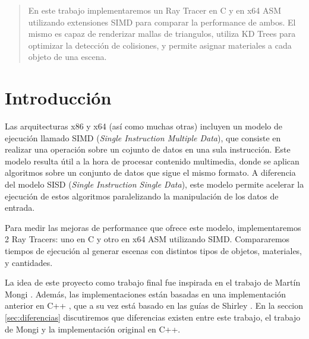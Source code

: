 \begin{abstract}
    En este trabajo implementaremos un Ray Tracer en C y en x64 ASM utilizando extensiones SIMD para
    comparar la performance de ambos. El mismo es capaz de renderizar mallas de triangulos, utiliza
    KD Trees para optimizar la detección de colisiones, y permite asignar materiales a cada objeto
    de una escena.
\end{abstract}

\section{Introducción} \label{sec:introduccion}

Las arquitecturas x86 y x64 (así como muchas otras) incluyen un modelo de ejecución llamado SIMD
(\textit{Single Instruction Multiple Data}), que consiste en realizar una operación sobre un cojunto
de datos en una sula instrucción. Este modelo resulta útil a la hora de procesar contenido
multimedia, donde se aplican algoritmos sobre un conjunto de datos que sigue el mismo formato. A
diferencia del modelo SISD (\textit{Single Instruction Single Data}), este modelo permite acelerar
la ejecución de estos algoritmos paralelizando la manipulación de los datos de entrada.

Para medir las mejoras de performance que ofrece este modelo, implementaremos 2 Ray Tracers: uno en
C y otro en x64 ASM utilizando SIMD. Compararemos tiempos de ejecución al generar escenas con
distintos tipos de objetos, materiales, y cantidades.

La idea de este proyecto como trabajo final fue inspirada en el trabajo de Martín Mongi
\cite{rtmartin}. Además, las implementaciones están basadas en una implementación anterior en C++
\cite{RayTracerCpp}, que a su vez está basado en las guías de Shirley \cite{RTIOW}. En la seccion
\ref{sec:diferencias} discutiremos que diferencias existen entre este trabajo, el trabajo de Mongi y
la implementación original en C++.

